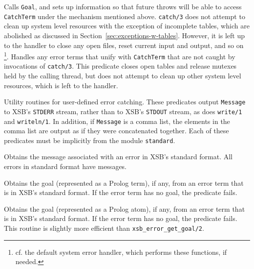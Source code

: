 \begin{description}
%
Calls {\tt Goal}, and sets up information so that future throws will
be able to access {\tt CatchTerm} under the mechanism mentioned
above. {\tt catch/3} does not attempt to clean up system level
resources with the exception of incomplete tables, which are abolished
as discussed in Section~\ref{sec:exceptions-w-tables}.  However, it is
left up to the handler to close any open files, reset current input
and output, and so on \footnote{cf. the default system error handler,
  which performs these functions, if needed.}.
%
%
Handles any error terms that unify with {\tt CatchTerm} that are not
caught by invocations of {\tt catch/3}.  This predicate closes open
tables and release mutexes held by the calling thread, but does not
attempt to clean up other system level resources, which is left to the
handler.
%

%
Utility routines for user-defined error catching.  These predicates
output {\tt Message} to XSB's {\tt STDERR} stream, rather than to
XSB's {\tt STDOUT} stream, as does {\tt write/1} and {\tt writeln/1}.
In addition, if {\tt Message} is a comma list, the elements in the
comma list are output as if they were concatenated together.  Each of
these predicates must be implicitly from the module {\tt standard}.

%
Obtains the message associated with an error in XSB's standard format.
All errors in standard format have messages.

%
Obtains the goal (represented as a Prolog term), if any, from an error term
that is in XSB's standard format.  If the error term has no goal, the
predicate fails.

%
Obtains the goal (represented as a Prolog atom), if any, from an error
term that is in XSB's standard format.  If the error term has no goal,
the predicate fails.  This routine is slightly more efficient than
{\tt xsb\_error\_get\_goal/2}.


\end{description}
